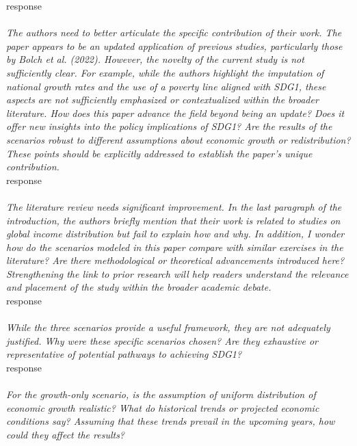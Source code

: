 \documentclass[12pt,english]{article}
\begin{document}
response
~\\ ~\\

\textit{The authors need to better articulate the specific contribution of their work. The paper appears to be an updated application of previous studies, particularly those by Bolch et al. (2022). However, the novelty of the current study is not sufficiently clear. For example, while the authors highlight the imputation of national growth rates and the use of a poverty line aligned with SDG1, these aspects are not sufficiently emphasized or contextualized within the broader literature. How does this paper advance the field beyond being an update? Does it offer new insights into the policy implications of SDG1? Are the results of the scenarios robust to different assumptions about economic growth or redistribution? These points should be explicitly addressed to establish the paper's unique contribution. }~\\

response
~\\ ~\\

\textit{The literature review needs significant improvement. In the last paragraph of the introduction, the authors briefly mention that their work is related to studies on global income distribution but fail to explain how and why. In addition, I wonder how do the scenarios modeled in this paper compare with similar exercises in the literature? Are there methodological or theoretical advancements introduced here? Strengthening the link to prior research will help readers understand the relevance and placement of the study within the broader academic debate. }~\\

response
~\\ ~\\

\textit{While the three scenarios provide a useful framework, they are not adequately justified. Why were these specific scenarios chosen? Are they exhaustive or representative of potential pathways to achieving SDG1? }~\\

response
~\\ ~\\

\textit{For the growth-only scenario, is the assumption of uniform distribution of economic growth realistic? What do historical trends or projected economic conditions say? Assuming that these trends prevail in the upcoming years, how could they affect the results? }~\\
\end{document}
